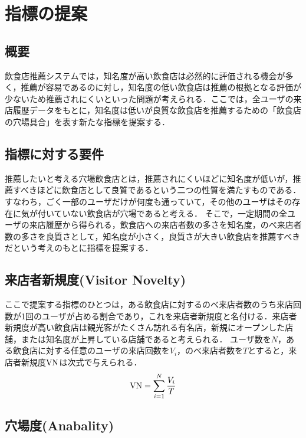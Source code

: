 \chapter{指標の提案}
\label{chap:proposal}

\section{概要}

飲食店推薦システムでは，知名度が高い飲食店は必然的に評価される機会が多く，推薦が容易であるのに対し，知名度の低い飲食店は推薦の根拠となる評価が少ないため推薦されにくいといった問題が考えられる．ここでは，全ユーザの来店履歴データをもとに，知名度は低いが良質な飲食店を推薦するための「飲食店の穴場具合」を表す新たな指標を提案する．

\section{指標に対する要件}

推薦したいと考える穴場飲食店とは，推薦されにくいほどに知名度が低いが，推薦すべきほどに飲食店として良質であるという二つの性質を満たすものである．
すなわち，ごく一部のユーザだけが何度も通っていて，その他のユーザはその存在に気が付いていない飲食店が穴場であると考える．
そこで，一定期間の全ユーザの来店履歴から得られる，飲食店への来店者数の多さを知名度，のべ来店者数の多さを良質さとして，知名度が小さく，良質さが大きい飲食店を推薦すべきだという考えのもとに指標を提案する．

\section{来店者新規度(Visitor Novelty)}

ここで提案する指標のひとつは，ある飲食店に対するのべ来店者数のうち来店回数が1回のユーザが占める割合であり，これを来店者新規度と名付ける．来店者新規度が高い飲食店は観光客がたくさん訪れる有名店，新規にオープンした店舗，または知名度が上昇している店舗であると考えられる．
ユーザ数を$N$，ある飲食店に対する任意のユーザの来店回数を$V_i$，のべ来店者数を$T$とすると，来店者新規度$\rm VN$は次式で与えられる．
\begin{equation}
	{\rm VN} = \sum^{N}_{i=1} \frac{V_i}{T}
\end{equation}

\section{穴場度(Anabality)}

